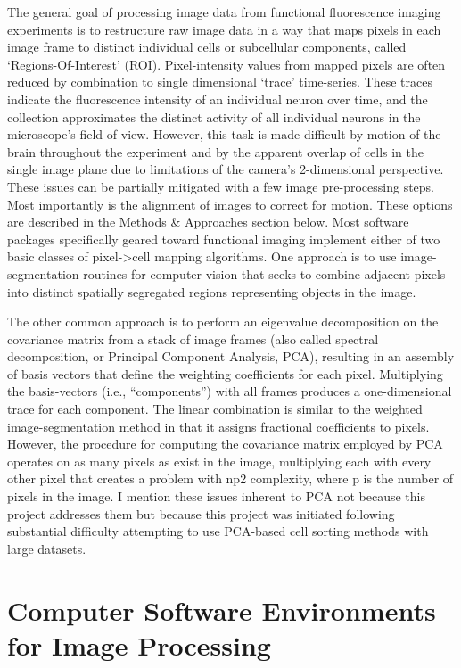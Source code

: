 \documentclass[../main.tex]{subfiles}
\begin{document}
The general goal of processing image data from functional fluorescence imaging experiments is to restructure raw image data in a way that maps pixels in each image frame to distinct individual cells or subcellular components, called `Regions-Of-Interest' (ROI).
Pixel-intensity values from mapped pixels are often reduced by combination to single dimensional `trace' time-series.
These traces indicate the fluorescence intensity of an individual neuron over time, and the collection approximates the distinct activity of all individual neurons in the microscope's field of view.
However, this task is made difficult by motion of the brain throughout the experiment and by the apparent overlap of cells in the single image plane due to limitations of the camera's 2-dimensional perspective.
These issues can be partially mitigated with a few image pre-processing steps.
Most importantly is the alignment of images to correct for motion.
These options are described in the Methods \& Approaches section below.
Most software packages specifically geared toward functional imaging implement either of two basic classes of pixel-\textgreater{}cell mapping algorithms.
One approach is to use image-segmentation routines for computer vision that seeks to combine adjacent pixels into distinct spatially segregated regions representing objects in the image.

The other common approach is to perform an eigenvalue decomposition on the covariance matrix from a stack of image frames (also called spectral decomposition, or Principal Component Analysis, PCA), resulting in an assembly of basis vectors that define the weighting coefficients for each pixel.
Multiplying the basis-vectors (i.e., ``components'') with all frames produces a one-dimensional trace for each component.
The linear combination is similar to the weighted image-segmentation method in that it assigns fractional coefficients to pixels.
However, the procedure for computing the covariance matrix employed by PCA operates on as many pixels as exist in the image, multiplying each with every other pixel that creates a problem with np2 complexity, where p is the number of pixels in the image.
I mention these issues inherent to PCA not because this project addresses them but because this project was initiated following substantial difficulty attempting to use PCA-based cell sorting methods with large datasets.

\section{Computer Software Environments for Image Processing}\label{sec:computer-software-environments-for-image-processing}
\end{document}
